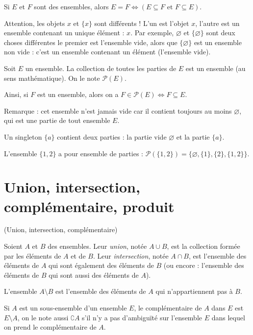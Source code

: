 \begin{remarque} Si $E$ et $F$ sont des ensembles, alors 
$
E=F \iff \left(E\subseteq F \text{ et } F \subseteq E\right).
$
\end{remarque}


\begin{remarque}
Attention, les objets $x$ et $\{x\}$ sont différents ! L'un est l'objet $x$, l'autre est un ensemble contenant un unique élément : $x$. Par exemple, $\varnothing$ et $\{\varnothing\}$ sont deux choses différentes le premier est l'ensemble vide, alors que $\{\varnothing\}$ est un ensemble non vide : c'est un ensemble contenant un élément (l'ensemble vide).
\end{remarque}

\begin{axiomedef}
Soit $E$ un ensemble. La collection de toutes les parties de $E$ est un ensemble (au sens mathématique). On le note $\mathcal P(E)$. 

Ainsi, si $F$ est un ensemble, alors on a $F\in \mathcal P(E) \iff F\subseteq E$.
\end{axiomedef}

Remarque : cet ensemble n'est jamais vide car il contient toujours au moins $\varnothing$, qui est une partie de  tout ensemble $E$.

\begin{exemple}Un singleton $\{a\}$ contient deux parties : la partie vide $\varnothing$ et la partie $\{a\}$. 

L'ensemble $\{1,2\}$ a pour ensemble de parties :  $\mathcal P(\{1,2\}) = \{\varnothing,\{1\},\{2\},\{1,2\}\}$.
\end{exemple}


\section{Union, intersection, complémentaire, produit}

\begin{definition}(Union, intersection, complémentaire)

Soient $A$ et $B$ des ensembles. Leur \emph{union}, notée $A\cup B$, est la collection formée par les éléments de $A$ et de $B$. Leur \emph{intersection}, notée $A\cap B$, est l'ensemble des éléments de $A$ qui sont également des éléments de $B$ (ou encore : l'ensemble des éléments de $B$ qui sont aussi des éléments de $A$). 

L'ensemble $A\setminus B$ est l'ensemble des éléments de $A$ qui n'appartiennent pas à $B$.

Si $A$ est un sous-ensemble d'un ensemble $E$, le complémentaire de $A$ dans $E$ est $E\setminus A$, on le note aussi $\complement A$ s'il n'y a pas d'ambiguïté sur l'ensemble $E$ dans lequel on prend le complémentaire de $A$.
\end{definition}


